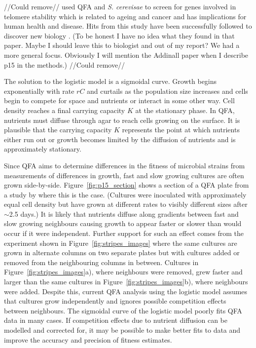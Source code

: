 //Could remove//
\citet{Addinall2011} used QFA and \textit{S. cerevisae} to screen for
genes involved in telomere stability which is related to ageing and
cancer and has implications for human health and disease. Hits from
this study have been successfully followed to discover new biology
\citep{Holstein20141259}. (To be honest I have no idea what they found
in that paper. Maybe I should leave this to biologist and out of my
report? We had a more general focus. Obviously I will mention the
Addinall paper when I describe p15 in the methods.)
//Could remove//




The solution to the logistic model is a sigmoidal curve. Growth begins
exponentially with rate \(rC\) and curtails as the population size
increases and cells begin to compete for space and nutrients or
interact in some other way. Cell density reaches a final carrying
capacity \(K\) at the stationary phase. In QFA, nutrients must diffuse
through agar to reach cells growing on the surface. It is plausible
that the carrying capacity \(K\) represents the point at which
nutrients either run out or growth becomes limited by the diffusion of
nutrients and is approximately stationary.

Since QFA aims to determine differences in the fitness of microbial
strains from measurements of differences in growth, fast and slow
growing cultures are often grown
side-by-side. Figure~\ref{fig:p15_section} shows a section of a QFA
plate from a study by \citeauthor*{Addinall2011} where this is the
case. (Cultures were inoculated with approximately equal cell density
but have grown at different rates to visibly different sizes after
\(\sim\)2.5 days.) It is likely that nutrients diffuse along gradients
between fast and slow growing neighbours causing growth to appear
faster or slower than would occur if it were independent. Further
support for such an effect comes from the experiment shown in
Figure~\ref{fig:stripes_images} where the same cultures are grown in
alternate columns on two separate plates but with cultures added or
removed from the neighbouring columns in between. Cultures in
Figure~\ref{fig:stripes_images}a), where neighbours were removed, grew
faster and larger than the same cultures in
Figure~\ref{fig:stripes_images}b), where neighbours were
added. Despite this, current QFA analysis using the logistic model
assumes that cultures grow independently and ignores possible
competition effects between neighbours. The sigmoidal curve of the
logistic model poorly fits QFA data in many cases. If competition
effects due to nutrient diffusion can be modelled and corrected for,
it may be possible to make better fits to data and improve the
accuracy and precision of fitness estimates.

